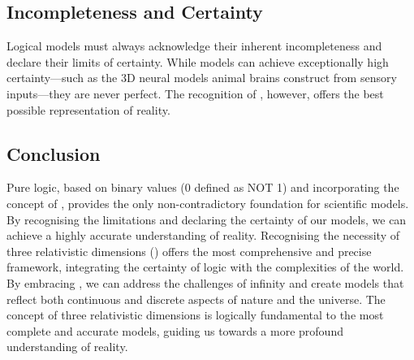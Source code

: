\documentclass{article}
\begin{document}
\subsection*{Incompleteness and Certainty}

Logical models must always acknowledge their inherent incompleteness and declare their limits of certainty. While models can achieve exceptionally high certainty—such as the 3D neural models animal brains construct from sensory inputs—they are never perfect. The recognition of \iR{}, however, offers the best possible representation of reality.

\subsection*{Conclusion}

Pure logic, based on binary values (0 defined as NOT 1) and incorporating the concept of \qbit{}, provides the only non-contradictory foundation for scientific models. By recognising the limitations and declaring the certainty of our models, we can achieve a highly accurate understanding of reality. Recognising the necessity of three relativistic dimensions (\iR{}) offers the most comprehensive and precise framework, integrating the certainty of logic with the complexities of the world. By embracing \qbit{}, we can address the challenges of infinity and create models that reflect both continuous and discrete aspects of nature and the universe. The concept of three relativistic dimensions is logically fundamental to the most complete and accurate models, guiding us towards a more profound understanding of reality.
\end{document}
